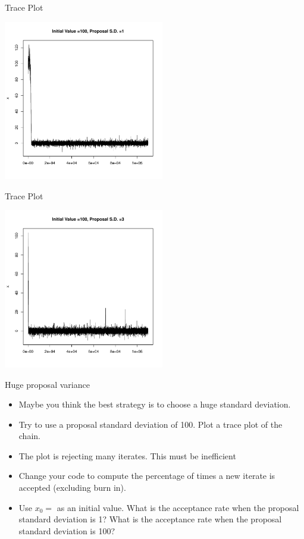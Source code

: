 \documentclass[10pt]{beamer}
\begin{document}
\begin{frame}{Trace Plot}
\begin{center}
\includegraphics[height=7cm]{./Pics/sp2.pdf}
\end{center}
\end{frame}
\begin{frame}{Trace Plot}
\begin{center}
\includegraphics[height=7cm]{./Pics/sp3.pdf}
\end{center}
\end{frame}
\begin{frame}{Huge proposal variance}
\begin{itemize}
\item Maybe you think the best strategy is to choose a huge standard deviation.

\item Try to use a proposal standard deviation of 100.  Plot a trace plot of the chain.

\item The plot is rejecting many iterates.  This must be inefficient

\item Change your code to compute the percentage of times a new iterate is accepted (excluding burn in).

\item Use $x_0=$ as an initial value.  What is the acceptance rate when the proposal standard deviation is 1?  What is the acceptance rate when the proposal standard deviation is 100?
\end{itemize}
\end{frame}
\end{document}
